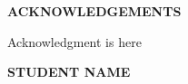 
\thispagestyle{empty} 


\vspace{-4cm}

\begin{center}
\large \bfseries{ACKNOWLEDGEMENTS}
\end{center}


Acknowledgment is here


\begin{flushright}
\normalsize \textbf{STUDENT NAME}
\end{flushright}


